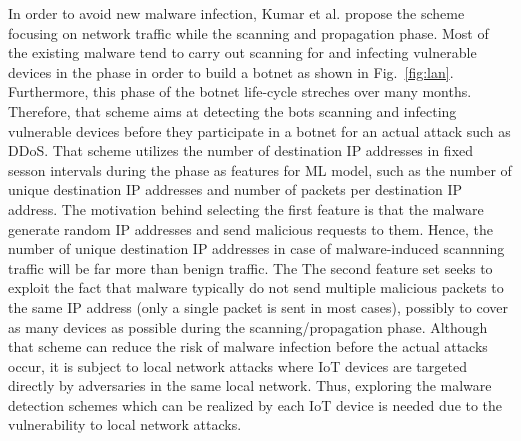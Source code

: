 \documentclass{ieeeaccess}
\newcommand{\myfigurename}{Fig.}
\begin{document}
In order to avoid new malware infection, Kumar et al. \cite{net} propose the scheme focusing on network traffic while the scanning and propagation phase.
Most of the existing malware tend to carry out scanning for and infecting vulnerable devices in the phase in order to build a botnet as shown in \myfigurename~\ref{fig:lan}.
Furthermore, this phase of the botnet life-cycle streches over many months.
Therefore, that scheme aims at detecting the bots scanning and infecting vulnerable devices before they participate in a botnet for an actual attack such as DDoS.
That scheme utilizes the number of destination IP addresses in fixed sesson intervals during the phase as features for ML model, such as the number of unique destination IP addresses and number of packets per destination IP address.
The motivation behind selecting the first feature is that the malware generate random IP addresses and send malicious requests to them.
Hence, the number of unique destination IP addresses in case of malware-induced scannning traffic will be far more than benign traffic. The
The second feature set seeks to exploit the fact that malware typically do not send multiple malicious packets to the same IP address (only a single packet is sent in most cases), possibly to cover as many devices as possible during the scanning/propagation phase.
Although that scheme can reduce the risk of malware infection before the actual attacks occur, it is subject to local network attacks where IoT devices are targeted directly by adversaries in the same local network.
Thus, exploring the malware detection schemes which can be realized by each IoT device is needed due to the vulnerability to local network attacks.
\end{document}
